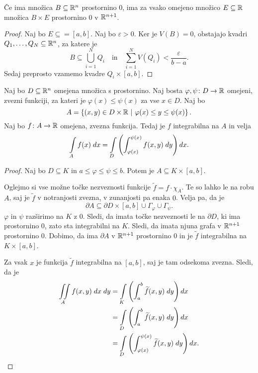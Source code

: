 \begin{lema}
Če ima množica $B \subseteq \mathbb{R}^n$ prostornino $0$, ima za vsako
omejeno množico $E \subseteq \mathbb{R}$ množica $B \times E$ prostornino
$0$ v $\mathbb{R}^{n+1}$.
\end{lema}

\begin{proof}
Naj bo $E \subseteq = [a,b]$. Naj bo $\varepsilon > 0$. Ker je
$V(B) = 0$, obstajajo kvadri $Q_1,\dots,Q_N \subseteq \mathbb{R}^n$, za
katere je
\[
B \subseteq \bigcup_{i=1}^N Q_i
\quad \text{in} \quad
\sum_{i=1}^N V(Q_i) < \frac{\varepsilon}{b-a}.
\]
Sedaj preprosto vzamemo kvadre $Q_i \times [a,b]$.
\end{proof}

\begin{trditev}
Naj bo $D \subseteq \mathbb{R}^n$ omejena množica s prostornino. Naj bosta
$\varphi,\psi \colon D \to \mathbb{R}$ omejeni, zvezni funkciji, za kateri
je $\varphi(x) \leq \psi(x)$ za vse $x \in D$. Naj bo
\[
A = \left\{(x,y) \in D \times \mathbb{R}~\middle\vert~\varphi(x) \leq y \leq \psi(x)\right\}.
\]
Naj bo $f \colon A \to \mathbb{R}$ omejena, zvezna funkcija. Tedaj je $f$
integrabilna na $A$ in velja
\[
\int\limits_A f(x)\;dx =
\int\limits_D \left( \int_{\varphi(x)}^{\psi(x)} f(x,y)\;dy\right)dx.
\]
\end{trditev}

\begin{proof}
Naj bo $D \subseteq K$ in $a \leq \varphi \leq \psi \leq b$. Potem
je $A \subseteq K \times [a,b]$.

Oglejmo si vse možne točke nezveznosti funkcije
$\widetilde{f} = f \cdot \chi_A$. Te so lahko le na robu $A$, saj
je $\widetilde{f}$ v notranjosti zvezna, v zunanjosti pa enaka $0$.
Velja pa, da je
\[
\partial A \subseteq
\partial D \times [a,b] \cup \Gamma_\varphi \cup \Gamma_\psi.
\]
$\varphi$ in $\psi$ razširimo na $K$ z $0$. Sledi, da imata točke
nezveznosti le na $\partial D$, ki ima prostornino $0$, zato sta
integrabilni na $K$. Sledi, da imata njuna grafa v $\mathbb{R}^{n+1}$
prostornino $0$. Dobimo, da ima $\partial A$ v $\mathbb{R}^{n+1}$
prostornino $0$ in je $\widetilde{f}$ integrabilna na
$K \times [a,b]$.

Za vsak $x$ je funkcija $\widetilde{f}$ integrabilna na $[a,b]$,
saj je tam odsekoma zvezna. Sledi, da je
\begin{align*}
\iint\limits_A f(x,y)\;dx\;dy &=
\int\limits_K \left(\int_a^b \widetilde{f}(x,y)\;dy\right)dx
\\
&=
\int\limits_D \left(\int_a^b \widetilde{f}(x,y)\;dy\right)dx
\\
&=
\int\limits_D \left(
\int_{\varphi(x)}^{\psi(x)} \widetilde{f}(x,y)\;dy\right)dx.
\qedhere
\end{align*}
\end{proof}

